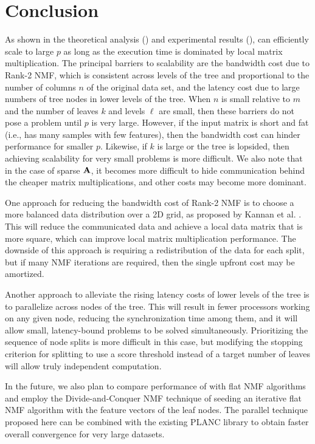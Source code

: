 
\section{Conclusion}

As shown in the theoretical analysis () and experimental results (),  can efficiently scale to large $p$ as long as the execution time is dominated by local matrix multiplication.
The principal barriers to scalability are the bandwidth cost due to Rank-2 NMF, which is consistent across levels of the tree and proportional to the number of columns $n$ of the original data set, and the latency cost due to large numbers of tree nodes in lower levels of the tree.
When $n$ is small relative to $m$ and the number of leaves $k$ and levels $\ell$ are small, then these barriers do not pose a problem until $p$ is very large.
However, if the input matrix is short and fat (i.e., has many samples with few features), then the bandwidth cost can hinder performance for smaller $p$.
Likewise, if $k$ is large or the tree is lopsided, then achieving scalability for very small problems is more difficult.
We also note that in the case of sparse $\M{A}$, it becomes more difficult to hide communication behind the cheaper matrix multiplications, and other costs may become more dominant.

One approach for reducing the bandwidth cost of Rank-2 NMF is to choose a more balanced data distribution over a 2D grid, as proposed by Kannan et al. \cite{KBP16}.
This will reduce the communicated data and achieve a local data matrix that is more square, which can improve local matrix multiplication performance.
The downside of this approach is requiring a redistribution of the data for each split, but if many NMF iterations are required, then the single upfront cost may be amortized.

Another approach to alleviate the rising latency costs of lower levels of the tree is to parallelize across nodes of the tree.
This will result in fewer processors working on any given node, reducing the synchronization time among them, and it will allow small, latency-bound problems to be solved simultaneously.
Prioritizing the sequence of node splits is more difficult in this case, but modifying the stopping criterion for splitting to use a score threshold instead of a target number of leaves will allow truly independent computation.

In the future, we also plan to compare performance of  with flat NMF algorithms and employ the Divide-and-Conquer NMF technique \cite{DKDP17} of seeding an iterative flat NMF algorithm with the feature vectors of the leaf nodes.
The parallel technique proposed here can be combined with the existing PLANC library \cite{EH+19-TR} to obtain faster overall convergence for very large datasets.
